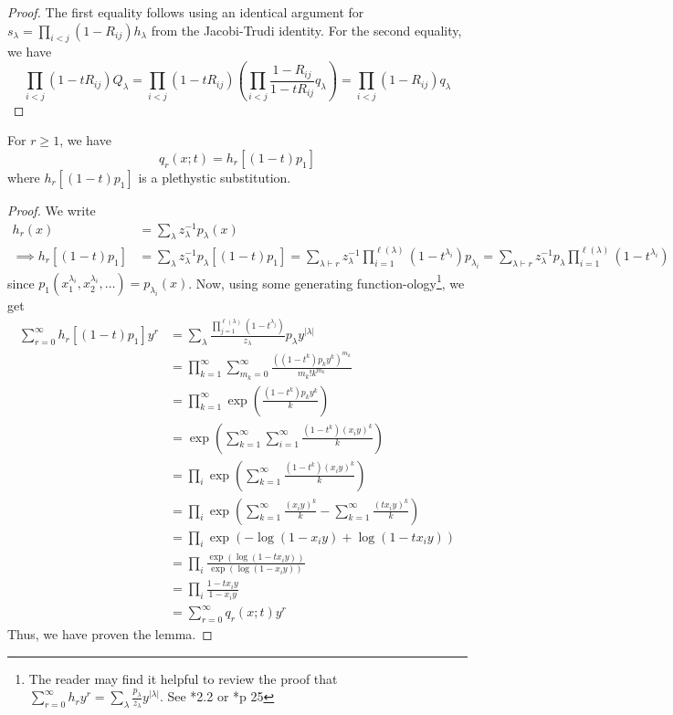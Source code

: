 \documentclass[11pt,leqno,oneside]{amsart}
\numberwithin{thm}{section}
\newcommand{\partitionof}{\vdash}
\newcommand{\exp}{\operatorname{exp}}
\begin{document}
\begin{proof}
  The first equality follows using an identical argument for
  \(s_\lambda = \prod_{i<j}(1-R_{ij}) h_\lambda\) from the
  Jacobi-Trudi identity. For the second equality, we have \[
    \prod_{i < j} (1-tR_{ij})Q_\lambda = \prod_{i <
      j}(1-tR_{ij})\left( \prod_{i<j} \frac{1-R_{ij}}{1-tR_{ij}}
      q_\lambda \right) = \prod_{i < j} (1-R_{ij}) q_\lambda
  \]
\end{proof}
\begin{lem}
  For \(r \geq 1\), we have \[
    q_r(x;t) = h_r[(1-t)p_{1}]
  \]
  where \(h_r[(1-t)p_{1}]\) is a plethystic substitution.
\end{lem}
\begin{proof}
  We write
  \begin{align*}
    h_r(x) & = \sum_{\lambda} z_\lambda^{-1} p_\lambda(x) \\
    \implies
    h_r[(1-t)p_1] & = \sum_{\lambda} z_\lambda^{-1} p_\lambda[(1-t)p_1]
    = \sum_{\lambda \partitionof r} z_\lambda^{-1}
    \prod_{i=1}^{\ell(\lambda)} (1-t^{\lambda_i}) p_{\lambda_i} 
    = \sum_{\lambda \partitionof r} z_\lambda^{-1} p_\lambda \prod_{i=1}^{\ell(\lambda)}(1-t^{\lambda_i})
  \end{align*}
  since \(p_1(x_1^{\lambda_i}, x_2^{\lambda_i}, \ldots) =
  p_{\lambda_i}(x)\).
  Now, using some generating function-ology\footnote{The reader may
    find it helpful to review the proof that \(\sum_{r=0}^\infty h_r
    y^r = \sum_\lambda \frac{p_\lambda}{z_\lambda}
    y^{|\lambda|}\). See \cite{alg-comb}*{2.2} or \cite{macdonald}*{p 25}}, we get
  \begin{align*}
    \sum_{r=0}^\infty h_r[(1-t)p_1] y^r
    & = \sum_\lambda
      \frac{\prod_{j=1}^{\ell(\lambda)} (1-t^{\lambda_j})}{z_\lambda} p_\lambda
      y^{|\lambda|} \\
    & = \prod_{k=1}^\infty\sum_{m_k=0}^\infty \frac{((1-t^k) p_k
      y^k)^{m_k}}{m_k! k^{m_k}}\\
    & = \prod_{k=1}^\infty \exp\left( \frac{(1-t^k)p_k y^k}{k}
      \right)\\
    & = \exp \left( \sum_{k=1}^\infty \sum_{i=1}^\infty
      \frac{(1-t^k)(x_i y)^k}{k} \right)\\
    & = \prod_i \exp\left( \sum_{k=1}^\infty \frac{(1-t^k)(x_i
      y)^k}{k} \right)\\
    & = \prod_i \exp\left( \sum_{k=1}^\infty \frac{(x_i y)^k}{k} -
      \sum_{k=1}^\infty \frac{(t x_i y)^k}{k} \right) \\
    & = \prod_i \exp\left( -\log(1-x_i y) + \log(1 - t x_i y) \right)
    \\
    & = \prod_i \frac{\exp(\log(1-tx_i y))}{\exp(\log(1- x_i y))} \\
    & = \prod_i \frac{1-t x_i y}{1 - x_i y} \\
    & = \sum_{r=0}^\infty q_r(x;t) y^r
  \end{align*}
  Thus, we have proven the lemma.
\end{proof}
\end{document}
